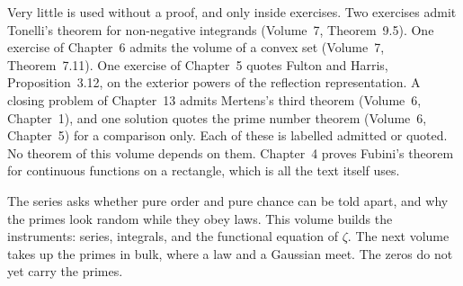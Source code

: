 Very little is used without a proof, and only inside exercises. Two exercises admit Tonelli's theorem for non-negative integrands (Volume~7, Theorem~9.5). One exercise of Chapter~6 admits the volume of a convex set (Volume~7, Theorem~7.11). One exercise of Chapter~5 quotes Fulton and Harris, Proposition~3.12, on the exterior powers of the reflection representation. A closing problem of Chapter~13 admits Mertens's third theorem (Volume~6, Chapter~1), and one solution quotes the prime number theorem (Volume~6, Chapter~5) for a comparison only. Each of these is labelled admitted or quoted. No theorem of this volume depends on them. Chapter~4 proves Fubini's theorem for continuous functions on a rectangle, which is all the text itself uses.

The series asks whether pure order and pure chance can be told apart, and why the primes look random while they obey laws. This volume builds the instruments: series, integrals, and the functional equation of $\zeta$. The next volume takes up the primes in bulk, where a law and a Gaussian meet. The zeros do not yet carry the primes.
